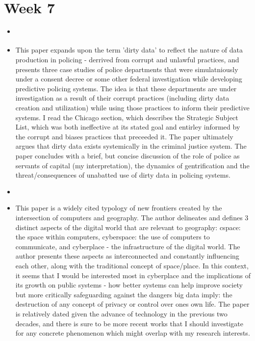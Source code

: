\documentclass{article}
\begin{document}
\section{Week 7}
\begin{itemize}
  
\item \cite{richardson2019DirtyData}
\item This paper expands upon the term 'dirty data' to reflect the nature of data production in policing - derrived from corrupt and unlawful practices, and presents three case studies of police departments that were simulatniously under a consent decree or some other federal investigation while developing predictive policing systems. The idea is that these departments are under investigation as a result of their corrupt practices (including dirty data creation and utilization) while using those practices to inform their predictive systems. I read the Chicago section, which describes the Strategic Subject List, which was both ineffective at its stated goal and entirley informed by the corrupt and biases practices that preceeded it. The paper ultimately argues that dirty data exists systemically in the criminal justice system. The paper concludes with a brief, but concise discussion of the role of police as servants of capital (my interpretation), the dynamics of gentrification and the threat/consequences of unabatted use of dirty data in policing systems.


\item \cite{batty1997VirtualGeographya}
\item This paper is a widely cited typology of new frontiers created by the intersection of computers and geography. The author delineates and defines 3 distinct aspects of the digital world that are relevant to geography: cspace: the space within computers, cyberspace: the use of computers to communicate, and cyberplace - the infrastructure of the digital world. The author presents these aspects as interconnected and constantly influencing each other, along with the traditional concept of space/place. In this context, it seems that I would be interested most in cyberplace and the implications of its growth on public systems - how better systems can help improve society but more critically safeguarding against the dangers big data imply: the destruction of any concept of privacy or control over ones own life. The paper is relatively dated given the advance of technology in the previous two decades, and there is sure to be more recent works that I should investigate for any concrete phenomenon which might overlap with my research interests.
\end{itemize}
\end{document}

